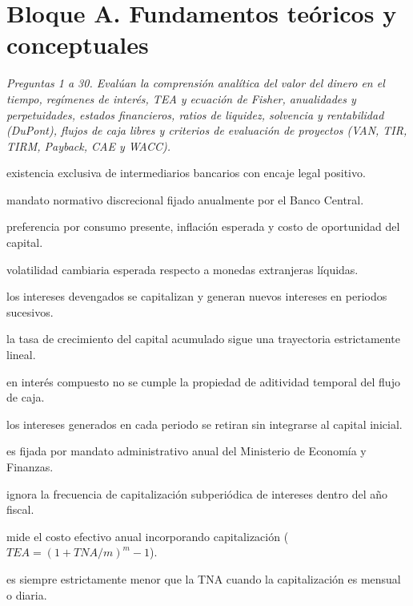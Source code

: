 \section*{Bloque A. Fundamentos teóricos y conceptuales}

\noindent\textit{Preguntas 1 a 30. Evalúan la comprensión analítica del valor del dinero en el tiempo, regímenes de interés, TEA y ecuación de Fisher, anualidades y perpetuidades, estados financieros, ratios de liquidez, solvencia y rentabilidad (DuPont), flujos de caja libres y criterios de evaluación de proyectos (VAN, TIR, TIRM, Payback, CAE y WACC).}

\begin{opts}
    \item existencia exclusiva de intermediarios bancarios con encaje legal positivo.
    \item mandato normativo discrecional fijado anualmente por el Banco Central.
    \item preferencia por consumo presente, inflación esperada y costo de oportunidad del capital.
    \item volatilidad cambiaria esperada respecto a monedas extranjeras líquidas.
\end{opts}

\begin{opts}
    \item los intereses devengados se capitalizan y generan nuevos intereses en periodos sucesivos.
    \item la tasa de crecimiento del capital acumulado sigue una trayectoria estrictamente lineal.
    \item en interés compuesto no se cumple la propiedad de aditividad temporal del flujo de caja.
    \item los intereses generados en cada periodo se retiran sin integrarse al capital inicial.
\end{opts}

\begin{opts}
    \item es fijada por mandato administrativo anual del Ministerio de Economía y Finanzas.
    \item ignora la frecuencia de capitalización subperiódica de intereses dentro del año fiscal.
    \item mide el costo efectivo anual incorporando capitalización ($TEA = (1 + TNA/m)^m - 1$).
    \item es siempre estrictamente menor que la TNA cuando la capitalización es mensual o diaria.
\end{opts}

